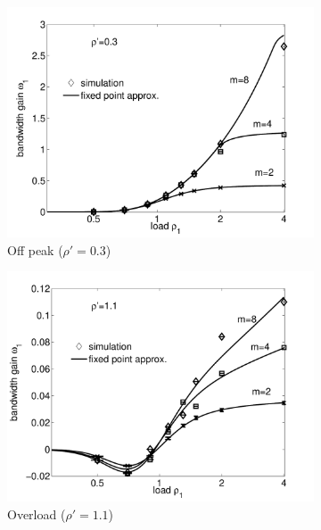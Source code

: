 \begin{figure}[tb]
\centering
\begin{subfigure}{.49\textwidth}
  \centering
  \includegraphics[width=\linewidth]{aggregation/performance_model/figures/fp_bwgain_rho03}
  \caption{Off peak ($\rho'=0.3$)}
  \label{fig:fp_bwgain_rho03}
\end{subfigure}%
\begin{subfigure}{.49\textwidth}
  \centering
  \includegraphics[width=\linewidth]{aggregation/performance_model/figures/fp_bwgain_rho11}
  \caption{Overload ($\rho'=1.1$)}
  \label{fig:fp_bwgain_rho11}
\end{subfigure}
\begin{subfigure}{.49\textwidth}

\end{subfigure}
\end{figure}
